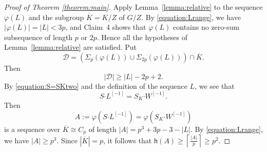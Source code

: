 \documentclass[a4paper, 12pt]{article}
\theoremstyle{definition}
\begin{document}
\begin{proof}[Proof of Theorem \ref{theorem:main}]
Apply Lemma~\ref{lemma:relative} to the sequence $\varphi(L)$ and
the subgroup
$\overline K=K/Z$ of $G/Z$. By \eqref{equation:Lrange}, we have
$|\varphi(L)|=|L|<3p$, and Claim~4 shows that $\varphi(L)$ contains
no zero-sum subsequence of length $p$ or $2p$. Hence all the
hypotheses of Lemma~\ref{lemma:relative} are satisfied. Put
$$
\mathcal D=
\left(
\Sigma_p(\varphi(L))
\cup
\Sigma_{2p}(\varphi(L))
\right)
\cap\overline K.
$$
Then
$$
|\mathcal D|\geq |L|-2p+2.
$$
By \eqref{equation:S=SKtwo} and the definition of the sequence $L$, we see that
\begin{equation}\label{equation:SL-1=SKW-1}
S\boldsymbol{\cdot}L^{[-1]}=
S_K\boldsymbol{\cdot}W^{[-1]}.
\end{equation}
Then
\begin{equation}\label{equation:A=varpi=varpi}
A:=\varphi\left(S\boldsymbol{\cdot}L^{[-1]}\right)=\varphi(S_K\boldsymbol{\cdot}W^{[-1]})
\end{equation}
is a sequence over $\overline K\cong C_p$ of length
$|A|=p^3+3p-3-|L|.$
By \eqref{equation:Lrange}, we have $|A|\geq p^3$. Since
$|\overline K|=p$, it follows that
$\mathsf h(A)
\geq
\left\lceil\frac{|A|}{p}\right\rceil
\geq p^2.$


\end{proof}
\end{document}

